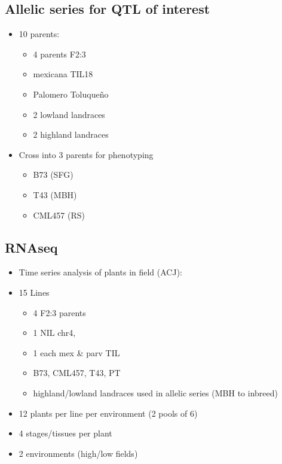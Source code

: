 \subsection{Allelic series for QTL of interest} \label{subsec:series}
\begin{itemize}
\item 10 parents:
\begin{itemize}
\item 4 parents F2:3
\item mexicana TIL18
\item Palomero Toluqueño
\item 2 lowland landraces
\item 2 highland landraces
\end{itemize}
\item Cross into 3 parents for phenotyping
\begin{itemize}
\item B73 (SFG)
\item T43 (MBH)
\item CML457 (RS)
\end{itemize}
\end{itemize}

\subsection{RNAseq} \label{subsec:rnaseq}
\begin{itemize}
\item Time series analysis of plants in field (ACJ):
\item 15 Lines
\begin{itemize}
\item 4 F2:3 parents
\item 1 NIL chr4,
\item 1 each mex \& parv TIL
\item B73, CML457, T43, PT
\item highland/lowland landraces used in allelic series (MBH to inbreed)
\end{itemize}
\item 12 plants per line per environment (2 pools of 6)
\item 4 stages/tissues per plant
\item 2 environments (high/low fields)
\end{itemize}



